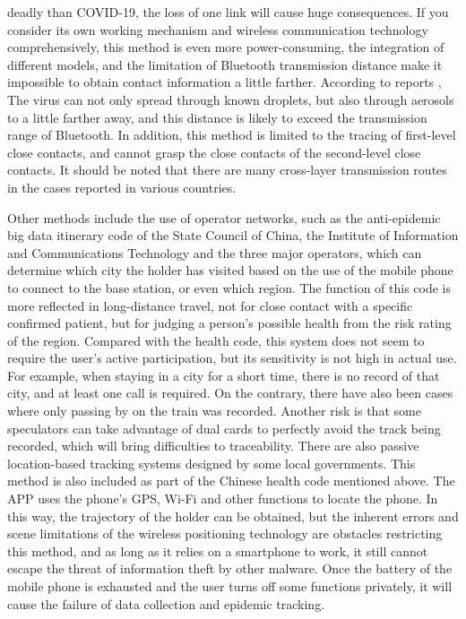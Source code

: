 \documentclass[conference]{IEEEtran}
\begin{document}
deadly than COVID-19, the loss of one link will cause huge consequences. If you consider its own working mechanism and wireless communication technology comprehensively, this method is even more power-consuming, the integration of different models, and the limitation of Bluetooth transmission distance make it impossible to obtain contact information a little farther. According to reports , The virus can not only spread through known droplets, but also through aerosols to a little farther away, and this distance is likely to exceed the transmission range of Bluetooth. In addition, this method is limited to the tracing of first-level close contacts, and cannot grasp the close contacts of the second-level close contacts. It should be noted that there are many cross-layer transmission routes in the cases reported in various countries.
\par Other methods include the use of operator networks, such as the anti-epidemic big data itinerary code of the State Council of China, the Institute of Information and Communications Technology and the three major operators, which can determine which city the holder has visited based on the use of the mobile phone to connect to the base station, or even which region. The function of this code is more reflected in long-distance travel, not for close contact with a specific confirmed patient, but for judging a person's possible health from the risk rating of the region. Compared with the health code, this system does not seem to require the user's active participation, but its sensitivity is not high in actual use. For example, when staying in a city for a short time, there is no record of that city, and at least one call is required. On the contrary, there have also been cases where only passing by on the train was recorded. Another risk is that some speculators can take advantage of dual cards to perfectly avoid the track being recorded, which will bring difficulties to traceability. There are also passive location-based tracking systems designed by some local governments. This method is also included as part of the Chinese health code mentioned above. The APP uses the phone’s GPS, Wi-Fi and other functions to locate the phone. In this way, the trajectory of the holder can be obtained, but the inherent errors and scene limitations of the wireless positioning technology are obstacles restricting this method, and as long as it relies on a smartphone to work, it still cannot escape the threat of information theft by other malware. Once the battery of the mobile phone is exhausted and the user turns off some functions privately, it will cause the failure of data collection and epidemic tracking.
\end{document}
